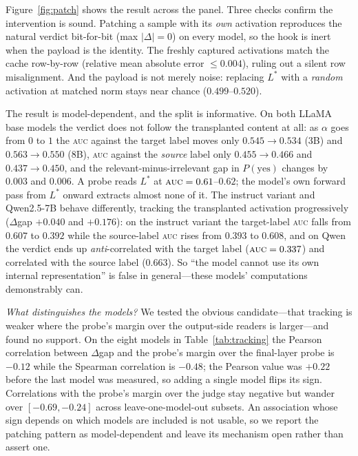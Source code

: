 \documentclass[11pt]{article}
\newcommand{\auc}{\textsc{auc}}
\begin{document}
Figure~\ref{fig:patch} shows the result across the panel.
Three checks confirm the intervention is sound. Patching a sample with its
\emph{own} activation reproduces the natural verdict bit-for-bit
(max $|\Delta|=0$) on every model, so the hook is inert when the payload is the
identity. The freshly captured activations match the cache row-by-row (relative
mean absolute error $\le0.004$), ruling out a silent row misalignment. And the
payload is not merely noise: replacing $L^*$ with a \emph{random} activation at
matched norm stays near chance ($0.499$--$0.520$).

The result is model-dependent, and the split is informative. On both LLaMA base
models the verdict does not follow the transplanted content at all: as $\alpha$
goes from $0$ to $1$ the \auc{} against the target label moves only
$0.545\!\to\!0.534$ (3B) and $0.563\!\to\!0.550$ (8B), \auc{} against the
\emph{source} label only $0.455\!\to\!0.466$ and $0.437\!\to\!0.450$, and the
relevant-minus-irrelevant gap in $P(\text{yes})$ changes by $0.003$ and
$0.006$. A probe reads $L^*$ at $\auc=0.61$--$0.62$; the model's own forward
pass from $L^*$ onward extracts almost none of it. The instruct variant and
Qwen2.5-7B behave differently, tracking the transplanted activation
progressively ($\Delta$gap $+0.040$ and $+0.176$): on the instruct variant the
target-label \auc{} falls from $0.607$ to $0.392$ while the source-label \auc{}
rises from $0.393$ to $0.608$, and on Qwen the verdict ends up
\emph{anti}-correlated with the target label ($\auc=0.337$) and correlated with
the source label ($0.663$). So ``the model cannot use its own internal
representation'' is false in general---these models' computations demonstrably
can.

\emph{What distinguishes the models?} We tested the obvious candidate---that
tracking is weaker where the probe's margin over the output-side readers is
larger---and found no support. On the eight models in Table~\ref{tab:tracking}
the Pearson correlation between $\Delta$gap and the probe's margin over the
final-layer probe is $-0.12$ while the Spearman correlation is $-0.48$; the
Pearson value was $+0.22$ before the last model was measured, so adding a single
model flips its sign. Correlations with the probe's margin over the judge stay
negative but wander over $[-0.69,-0.24]$ across leave-one-model-out subsets. An
association whose sign depends on which models are included is not usable, so we
report the patching pattern as model-dependent and leave its mechanism open
rather than assert one.
\end{document}
